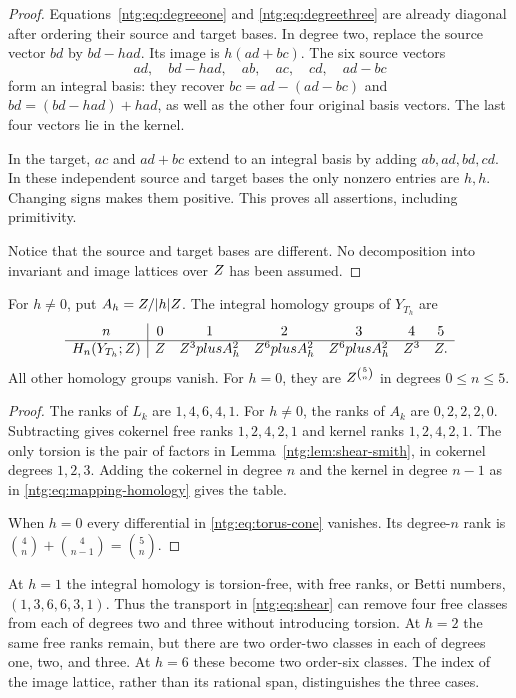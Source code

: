 \begin{proof}
Equations~\eqref{ntg:eq:degreeone} and \eqref{ntg:eq:degreethree} are already
diagonal after ordering their source and target bases. In degree two,
replace the source vector $bd$ by $bd-had$. Its image is
$h(ad+bc)$. The six source vectors
\[
 ad,\quad bd-had,\quad ab,\quad ac,\quad cd,\quad ad-bc
\]
form an integral basis: they recover $bc=ad-(ad-bc)$ and
$bd=(bd-had)+had$, as well as the other four original basis vectors.
The last four vectors lie in the kernel.

In the target, $ac$ and
$ad+bc$ extend to an integral basis by adding $ab,ad,bd,cd$.
In these independent source and target bases the only nonzero entries
are $h,h$. Changing signs makes them positive. This proves all
assertions, including primitivity.

Notice that the source and target
bases are different. No decomposition into invariant and image
lattices over $Z$ has been assumed.
\end{proof}

\begin{theorem}\label{ntg:thm:shear-homology}
For $h\ne0$, put $A_h=Z/|h|Z$. The integral homology groups
of $Y_{T_h}$ are
\begin{equation}\label{ntg:eq:shear-homology}
\begin{array}{c|cccccc}
 n&0&1&2&3&4&5\\ \hline
 H_n(Y_{T_h};Z)&Z&Z^3plus A_h^2&Z^6plus A_h^2&
 Z^6plus A_h^2&Z^3&Z.
\end{array}
\end{equation}
All other homology groups vanish. For $h=0$, they are
$Z^{\binom5n}$ in degrees $0\le n\le5$.
\end{theorem}

\begin{proof}
The ranks of $L_k$ are $1,4,6,4,1$. For $h\ne0$, the ranks of
$A_k$ are $0,2,2,2,0$. Subtracting gives cokernel free ranks
$1,2,4,2,1$ and kernel ranks $1,2,4,2,1$.
The only torsion is the pair of factors in
Lemma~\ref{ntg:lem:shear-smith}, in cokernel degrees $1,2,3$.
Adding the cokernel in degree $n$ and the kernel in degree $n-1$
as in \eqref{ntg:eq:mapping-homology} gives the table.

When $h=0$ every
differential in \eqref{ntg:eq:torus-cone} vanishes. Its degree-$n$ rank
is $\binom4n+\binom4{n-1}=\binom5n$.
\end{proof}

At $h=1$ the integral homology is torsion-free, with free ranks, or
Betti numbers, $(1,3,6,6,3,1)$. Thus the transport in
\eqref{ntg:eq:shear} can remove four
free classes from each of degrees two and three without introducing
torsion. At $h=2$ the same free ranks remain, but there are two
order-two classes in each of degrees one, two, and three. At $h=6$
these become two order-six classes. The index of the image lattice,
rather than its rational span, distinguishes the three cases.

